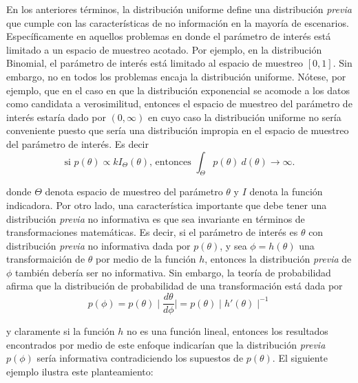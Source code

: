 \documentclass[10pt,openright]{book}\usepackage[]{graphicx}\usepackage[]{color}
\begin{document}
En los anteriores términos, la distribución uniforme define una distribución \emph{previa} que cumple con las características de no información en la mayoría de escenarios. Específicamente en aquellos problemas en donde el parámetro de interés está limitado a un espacio de muestreo acotado. Por ejemplo, en la distribución Binomial, el parámetro de interés está limitado al espacio de muestreo $[0,1]$. Sin embargo, no en todos los problemas encaja la distribución uniforme. Nótese, por ejemplo, que en el caso en que la distribución exponencial se acomode a los datos como candidata a verosimilitud, entonces el espacio de muestreo del parámetro de interés estaría dado por $(0,\infty)$ en cuyo caso la distribución uniforme no sería conveniente puesto que sería una distribución impropia en el espacio de muestreo del parámetro de interés. Es decir
\begin{equation*}
\text{si } p(\theta)\propto kI_{\Theta}(\theta) \text{, entonces } \int_{\Theta}p(\theta) \ d(\theta)\longrightarrow \infty.
\end{equation*}

donde $\Theta$ denota espacio de muestreo del parámetro $\theta$ y $I$ denota la función indicadora. Por otro lado, una característica importante que debe tener una distribución \emph{previa} no informativa es que sea invariante en términos de transformaciones matemáticas. Es decir, si el parámetro de interés es $\theta$ con distribución \emph{previa} no informativa dada por $p(\theta)$, y sea $\phi=h(\theta)$ una transformaición de $\theta$ por medio de la función $h$, entonces la distribución \emph{previa} de $\phi$ también debería ser no informativa. Sin embargo, la teoría de probabilidad afirma que la distribución de probabilidad de una transformación está dada por
\begin{equation}\label{teo_transf}
p(\phi)=p(\theta) \mid \frac{d\theta}{d\phi} \mid =p(\theta) \mid h'(\theta) \mid ^{-1}
\end{equation}

y claramente si la función $h$ no es una función lineal, entonces los resultados encontrados por medio de este enfoque indicarían que la distribución \emph{previa} $p(\phi)$ sería informativa contradiciendo los supuestos de $p(\theta)$. El siguiente ejemplo ilustra este planteamiento:
\end{document}
